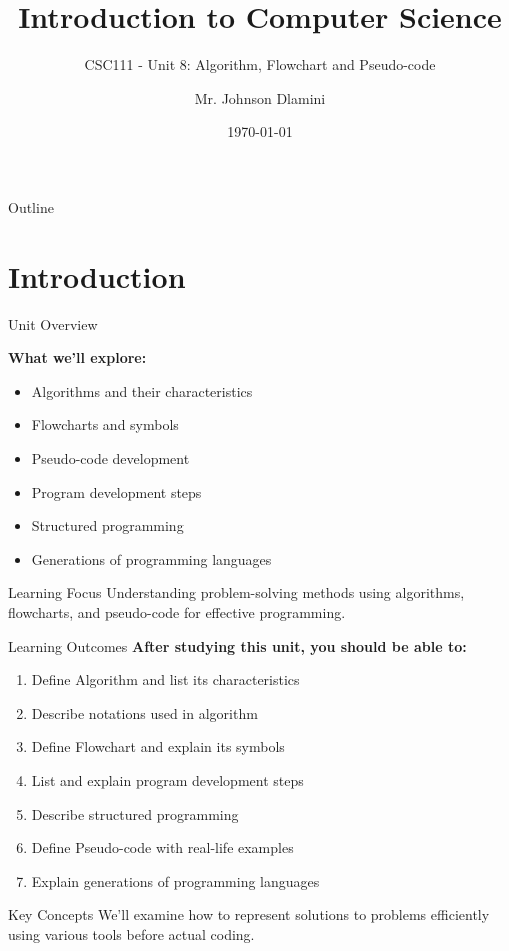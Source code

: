 \documentclass[aspectratio=169]{beamer}
\title[University of Eswatini]{Introduction to Computer Science}
\subtitle{CSC111 - Unit 8: Algorithm, Flowchart and Pseudo-code}
\author[J.S.D]{Mr. Johnson Dlamini}
\institute[jsdlamini@uniswa.sz]{The University of Eswatini}
\date{\today}
\begin{document}
\frame{\titlepage}

\begin{frame}{Outline}
    \tableofcontents
\end{frame}

\section{Introduction}

\begin{frame}{Unit Overview}
    
            \textbf{What we'll explore:}
            \begin{itemize}
                \item Algorithms and their characteristics
                \item Flowcharts and symbols
                \item Pseudo-code development
                \item Program development steps
                \item Structured programming
                \item Generations of programming languages
            \end{itemize}
 
    
    \vspace{0.5cm}
    \begin{alertblock}{Learning Focus}
        Understanding problem-solving methods using algorithms, flowcharts, and pseudo-code for effective programming.
    \end{alertblock}
\end{frame}

\begin{frame}{Learning Outcomes}
    \textbf{After studying this unit, you should be able to:}
    \begin{enumerate}
        \item Define Algorithm and list its characteristics
        \item Describe notations used in algorithm
        \item Define Flowchart and explain its symbols
        \item List and explain program development steps
        \item Describe structured programming
        \item Define Pseudo-code with real-life examples
        \item Explain generations of programming languages
    \end{enumerate}
    
    \vspace{0.3cm}
    \begin{exampleblock}{Key Concepts}
        We'll examine how to represent solutions to problems efficiently using various tools before actual coding.
    \end{exampleblock}
\end{frame}
\end{document}
